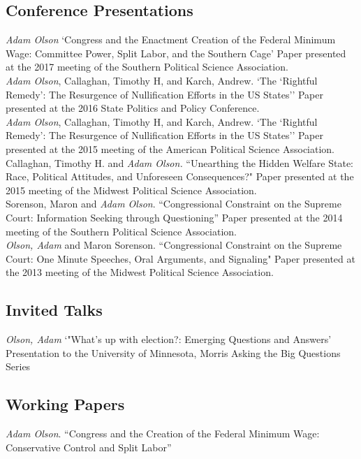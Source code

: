 \documentclass[12pt, letter]{article}
\newcommand{\years}[1]{\marginnote{\normalsize #1}}
\begin{document}
\subsection*{Conference Presentations}
\noindent
\years{2017}\emph{Adam Olson} `Congress and the Enactment Creation of the Federal Minimum Wage: Committee Power, Split Labor, and the Southern Cage' Paper presented at the 2017 meeting of the Southern Political Science Association. \\

\years{2016}\emph{Adam Olson}, Callaghan, Timothy H, and Karch, Andrew. `The `Rightful Remedy': The Resurgence of Nullification Efforts in the US States'' Paper presented at the 2016 State Politics and Policy Conference.\\

\years{2015}\emph{Adam Olson}, Callaghan, Timothy H, and Karch, Andrew. `The `Rightful Remedy': The Resurgence of Nullification Efforts in the US States'' Paper presented at the 2015 meeting of the American Political Science Association.\\

Callaghan, Timothy H. and \emph{Adam Olson.} ``Unearthing the Hidden Welfare State: Race, Political Attitudes, and Unforeseen Consequences?" Paper presented at the 2015 meeting of the Midwest Political Science Association.\\

\years{2014}Sorenson, Maron and \emph{Adam Olson}. ``Congressional Constraint on the Supreme Court: Information Seeking through Questioning'' Paper presented at the 2014 meeting of the Southern Political Science Association.\\

\years{2013}\emph{Olson, Adam} and Maron Sorenson. ``Congressional Constraint on the Supreme Court: One Minute Speeches, Oral Arguments, and Signaling" Paper presented at the 2013 meeting of the Midwest Political Science Association.

\subsection*{Invited Talks}
\years{2016} \textit{Olson, Adam} `"What's up with election?: Emerging Questions and Answers' Presentation to the University of Minnesota, Morris Asking the Big Questions Series
\subsection*{Working Papers}
\noindent
\emph{Adam Olson}. ``Congress and the Creation of the Federal Minimum Wage: Conservative Control and Split Labor'' \\
\end{document}

